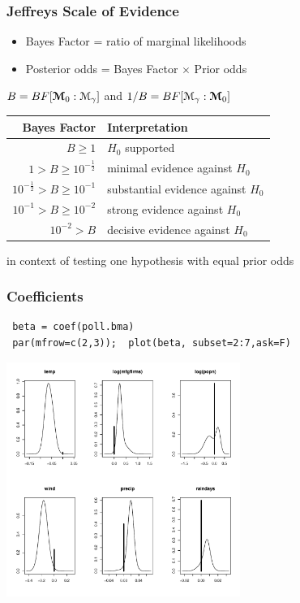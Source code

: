 \documentclass[]{beamer}
\begin{document}
\begin{frame}
\frametitle{Jeffreys Scale of Evidence}
\begin{itemize}
\item Bayes Factor = ratio of marginal likelihoods \pause

\item Posterior odds = Bayes Factor $\times$ Prior odds \pause

\end{itemize}


$B = BF[\boldsymbol{{\cal M}}_0 : {\cal M}_\gamma]$   and $1/B = BF[{\cal M}_\gamma : \boldsymbol{{\cal M}}_0]$ \pause

\vspace{14pt}

\begin{tabular}{|r|l|} \hline \hline
Bayes Factor & Interpretation \\ \hline
$B \geq 1$ & $H_0$ supported \\
$1 > B \geq 10^{-\frac{1}{2}} $ & minimal evidence against $H_0$ \\
$ 10^{- \frac{1}{2}} > B  \geq 10^{-1}$ & substantial evidence against $H_0$ \\
$ 10^{-1} > B  \geq 10^{-2}$ & strong evidence against $H_0$ \\
$ 10^{-2} > B $ & decisive evidence against $H_0$ \\ \hline \hline
\end{tabular}
\pause
in context of testing one hypothesis with equal prior odds
\end{frame}


\begin{frame}[fragile]
\frametitle{Coefficients}
\begin{verbatim}
 beta = coef(poll.bma)
 par(mfrow=c(2,3));  plot(beta, subset=2:7,ask=F)
\end{verbatim}
\centering
\includegraphics[height=3in]{poll-beta}  

\end{frame}
\end{document}

